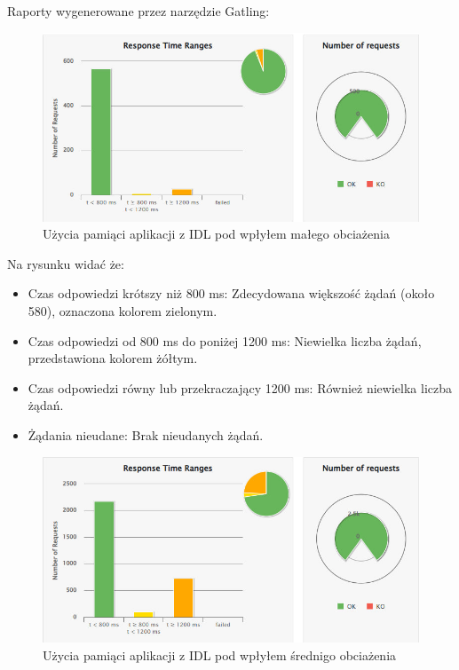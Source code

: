 \documentclass[runningheads,12pt]{llncs}
\begin{document}
\newpage

Raporty wygenerowane przez narzędzie Gatling: 

\begin{figure}
    \includegraphics[width=\linewidth]{images/idl-low-gatling-graph.jpg}
    \caption{Użycia pamiąci aplikacji z IDL pod wpłyłem małego obciażenia} \label{fig1}
\end{figure}

Na rysunku widać że:

\begin{itemize}
    \item Czas odpowiedzi krótszy niż 800 ms: Zdecydowana większość żądań (około 580), oznaczona kolorem zielonym.
    \item Czas odpowiedzi od 800 ms do poniżej 1200 ms: Niewielka liczba żądań, przedstawiona kolorem żółtym.
    \item Czas odpowiedzi równy lub przekraczający 1200 ms: Również niewielka liczba żądań.
    \item Żądania nieudane: Brak nieudanych żądań.
  \end{itemize}

\begin{figure}
    \includegraphics[width=\linewidth]{images/idl-midle-gatling-graph.jpg}
    \caption{Użycia pamiąci aplikacji z IDL pod wpłyłem średnigo obciażenia} \label{fig1}
\end{figure}
\end{document}
